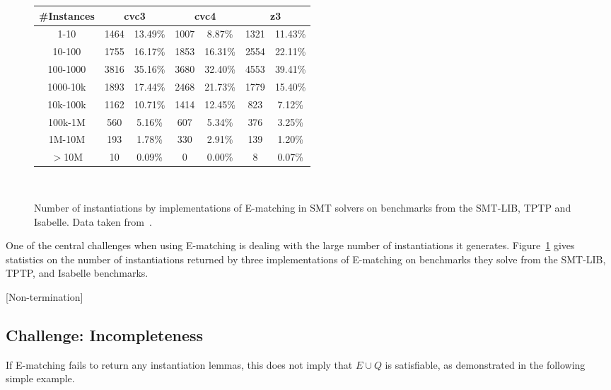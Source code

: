 \documentclass[oribibl]{llncs}
\begin{document}
\begin{figure}[t]
\centering
{
\begin{tabular}{|c|cc|cc|cc|}      
\hline                                                                      
\#Instances & \multicolumn{2}{c|}{{\bf cvc3}} & \multicolumn{2}{c|}{{\bf cvc4}} & \multicolumn{2}{c|}{{\bf z3}} \\
\hline   
1-10 & 1464 & 13.49\% & 1007 & 8.87\% & 1321 & 11.43\% \\
10-100 & 1755 & 16.17\% & 1853 & 16.31\% & 2554 & 22.11\% \\
100-1000 & 3816 & 35.16\% & 3680 & 32.40\% & 4553 & 39.41\% \\
1000-10k & 1893 & 17.44\% & 2468 & 21.73\% & 1779 & 15.40\% \\
10k-100k & 1162 & 10.71\% & 1414 & 12.45\% & 823 & 7.12\% \\
100k-1M & 560 & 5.16\% & 607 & 5.34\% & 376 & 3.25\% \\
1M-10M & 193 & 1.78\% & 330 & 2.91\% & 139 & 1.20\% \\
$>$10M & 10 & 0.09\% & 0 & 0.00\% & 8 & 0.07\%  \\                           
\hline                                                                
\end{tabular}
\\
}
\caption{Number of instantiations by implementations of E-matching in SMT solvers
on benchmarks from the SMT-LIB, TPTP and Isabelle. Data taken from~\cite{}.}
\label{fig:results-inst}
\end{figure}

One of the central challenges when using E-matching is dealing with the large number of instantiations it generates.
Figure~\ref{fig:results-inst} gives statistics on the number of instantiations returned by three implementations of E-matching
on benchmarks they solve from the SMT-LIB, TPTP, and Isabelle benchmarks.


[Non-termination]
\begin{example}

\end{example}

\subsection{Challenge: Incompleteness}

If E-matching fails to return any instantiation lemmas,
this does not imply that $E \cup Q$ is satisfiable, as demonstrated in the following simple example.
\end{document}
